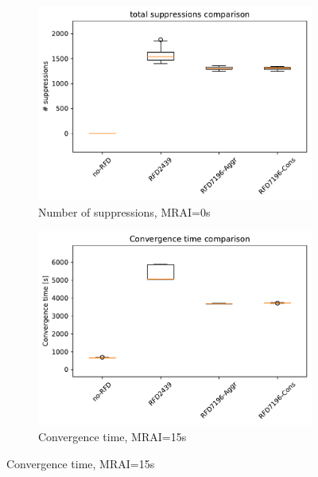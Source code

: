 \begin{figure}[H]
     \hfill
     \begin{subfigure}[b]{0.325\textwidth}
         \centering
         \includegraphics[width=\textwidth]{images/RFD/miceVSelephants/MultiMRAI/0/elephants/cisco_1000MRAI0_rfd_comparison_suppressions_boxplot.pdf}
         \caption{\scriptsize Number of suppressions, MRAI=0s}
         \label{fig:1000_RFD_MRAI0_suppressions_elephant}
     \end{subfigure}
     \vfill
     \begin{subfigure}[b]{0.325\textwidth}
         \centering
         \includegraphics[width=\textwidth]{images/RFD/miceVSelephants/MultiMRAI/15/elephants/cisco_1000MRAI15_rfd_comparison_time_boxplot.pdf}
         \caption{\scriptsize Convergence time, MRAI=15s}
         \label{fig:1000_RFD_MRAI15_time_elephant}
     \end{subfigure}

\end{figure}
